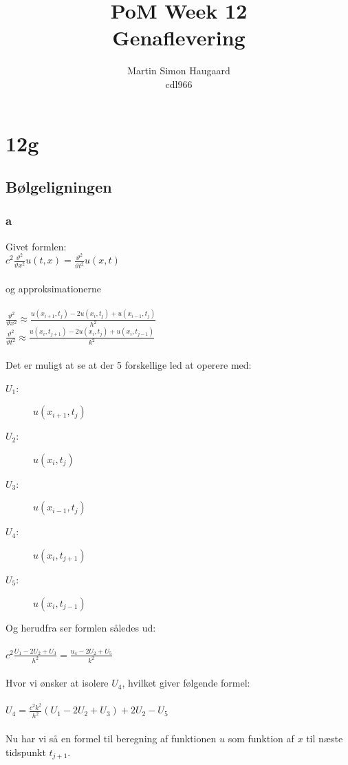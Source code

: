 \documentclass[11pt]{article} %
\title{PoM Week 12\\Genaflevering}
\author{Martin Simon Haugaard\\cdl966}
\begin{document}
\maketitle

\section*{12g}
\subsection{Bølgeligningen}
\subsubsection*{a}
Givet formlen:\\
$c^2 \frac{\vartheta^2}{\vartheta x^2}u(t,x) = \frac{\vartheta^2}{\vartheta t^2}u(x,t)$\\
\\
og approksimationerne\\
\\
$\frac{\vartheta^2}{\vartheta x^2} \approx \frac{u(x_{i+1}, t_j) - 2u(x_i, t_j) + u(x_{i-1}, t_j)}{h^2} $
\\
$\frac{\vartheta^2}{\vartheta t^2} \approx \frac{u(x_i, t_{j+1}) - 2u(x_i, t_j) + u(x_i, t_{j-1})}{k^2} $\\
\\
Det er muligt at se at der 5 forskellige led at operere med:
\begin{description}
\item[$U_1$:]{$u(x_{i+1}, t_j)$}
\item[$U_2$:]{$u(x_i, t_j)$}
\item[$U_3$:]{$u(x_{i-1}, t_j)$}
\item[$U_4$:]{$u(x_i, t_{j+1})$}
\item[$U_5$:]{$u(x_i, t_{j-1})$}
\end{description}
Og herudfra ser formlen således ud:\\
\\
$c^2\frac{U_1 - 2 U_2 + U_3}{h^2}=\frac{u_4 - 2 U_2 + U_5}{k^2}$\\
\\
Hvor vi ønsker at isolere $U_4$, hvilket giver følgende formel:\\
\\
$U_4 = \frac{c^2 k^2}{h^2}(U_1 - 2 U_2 + U_3) + 2 U_2 - U_5$\\
\\
Nu har vi så en formel til beregning af funktionen $u$ som funktion af $x$ til næste tidspunkt $t_{j+1}$.
\end{document}
